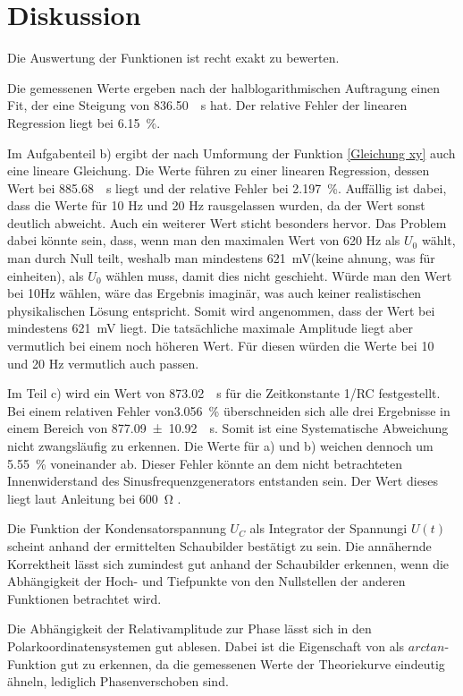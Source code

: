 \section{Diskussion}
\label{sec:Diskussion}

Die Auswertung der Funktionen ist recht exakt zu bewerten. %

Die gemessenen Werte ergeben nach der halblogarithmischen Auftragung einen Fit, der eine Steigung von 
\SI{836.50}{\per\second} hat. Der relative Fehler der linearen Regression liegt bei \SI{6.15}{\percent}. 

Im Aufgabenteil b) ergibt der nach Umformung der Funktion \eqref{Gleichung xy}  auch eine lineare Gleichung.
Die Werte führen zu einer linearen Regression, dessen Wert bei \SI{885.68}{\per\second} liegt und der relative
Fehler bei \SI{2.197}{\percent}. Auffällig ist dabei, dass die Werte für 10 Hz und 20 Hz rausgelassen wurden,
da der Wert sonst deutlich abweicht. Auch ein weiterer Wert sticht besonders hervor. Das Problem dabei könnte sein,
dass, wenn man den maximalen Wert von 620 Hz als $U_{0}$ wählt, man durch Null teilt, weshalb man mindestens
\SI{621}{\milli\volt}(keine ahnung, was für einheiten), als $U_{0}$ wählen muss, damit dies nicht geschieht.
Würde man den Wert bei 10Hz wählen, wäre das Ergebnis imaginär, was auch keiner realistischen physikalischen
Lösung entspricht. Somit wird angenommen, dass der Wert bei mindestens \SI{621}{\milli\volt} liegt. Die tatsächliche
maximale Amplitude liegt aber vermutlich bei einem noch höheren Wert. Für diesen würden die Werte bei 10 und 20 Hz
vermutlich auch passen. 

Im Teil c) wird ein Wert von \SI{873.02}{\per\second} für die Zeitkonstante 1/RC festgestellt. Bei einem relativen
Fehler von\SI{3.056}{\percent} überschneiden sich alle drei Ergebnisse in einem Bereich von
\SI{877.09 \pm 10.92}{\per\second}. Somit ist eine Systematische Abweichung nicht zwangsläufig zu erkennen.
Die Werte für a) und b) weichen dennoch um \SI{5.55}{\percent} voneinander ab. Dieser Fehler könnte an dem nicht
betrachteten Innenwiderstand des Sinusfrequenzgenerators entstanden sein. Der Wert dieses liegt laut Anleitung bei
\SI{600}{\ohm} \cite{V353}. 

Die Funktion der Kondensatorspannung $U_{C}$ als Integrator der Spannungi $U(t)$ scheint anhand der ermittelten
Schaubilder bestätigt zu sein. Die annähernde Korrektheit lässt sich zumindest gut anhand der Schaubilder erkennen,
wenn die Abhängigkeit der Hoch- und Tiefpunkte von den Nullstellen der anderen Funktionen betrachtet wird. 

Die Abhängigkeit der Relativamplitude zur Phase \phi lässt sich in den Polarkoordinatensystemen gut ablesen.
Dabei ist die Eigenschaft von \phi als $arctan$-Funktion gut zu erkennen, da die gemessenen Werte der Theoriekurve
eindeutig ähneln, lediglich Phasenverschoben sind. 
